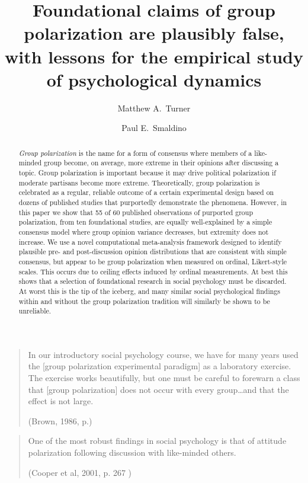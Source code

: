 \documentclass[
  abstract]{article}
\title{Foundational claims of group polarization are plausibly false,
with lessons for the empirical study of psychological dynamics}
\author[1,*]{{Matthew A.~Turner}}
\affil[1]{\small Division of Social Sciences, Stanford Doerr School of Sustainability, Stanford University}
\author[2,3]{{Paul E.~Smaldino}}
\affil[2]{\small Cognitive and Information Sciences, University of California, Merced}
\affil[3]{\small Santa Fe Institute}
\affil[*]{\small Correspondence: \href{mailto:maturner@stanford.edu}{maturner@stanford.edu}}
\date{}
\renewcommand*\contentsname{Table of contents}
\newcommand\contentsname{Table of contents}
\begin{document}
\maketitle
\begin{abstract}
\noindent \emph{Group polarization} is the name for a form of consensus
where members of a like-minded group become, on average, more extreme in
their opinions after discussing a topic. Group polarization is important
because it may drive political polarization if moderate partisans become
more extreme. Theoretically, group polarization is celebrated as a
regular, reliable outcome of a certain experimental design based on
dozens of published studies that purportedly demonstrate the phenomena.
However, in this paper we show that 55 of 60 published observations of
purported group polarization, from ten foundational studies, are equally
well-explained by a simple consensus model where group opinion variance
decreases, but extremity does not increase. We use a novel computational
meta-analysis framework designed to identify plausible pre- and
post-discussion opinion distributions that are consistent with simple
consensus, but appear to be group polarization when measured on ordinal,
Likert-style scales. This occurs due to ceiling effects induced by
ordinal measurements. At best this shows that a selection of
foundational research in social psychology must be discarded. At worst
this is the tip of the iceberg, and many similar social psychological
findings within and without the group polarization tradition will
similarly be shown to be unreliable.
\end{abstract}

\renewcommand*\contentsname{Table of contents}
{
\hypersetup{linkcolor=}
\setcounter{tocdepth}{3}
\tableofcontents
}
\begin{quote}
In our introductory social psychology course, 
we have for many years used the [group polarization experimental paradigm] as
a laboratory exercise. The exercise works beautifully, but one must be
careful to forewarn a class that [group polarization] does not occur with every 
group\ldots and that the effect is not large. 
\par\raggedleft(Brown, 1986, p.\cite[p. 205]{Brown1986})
\end{quote}

\begin{quote}
One of the most robust findings in social psychology is that of attitude polarization 
following discussion with like-minded others.
\par\raggedleft(Cooper et al, 2001, p. 267 \cite[p. 267]{Cooper2001})
\end{quote}
\end{document}
